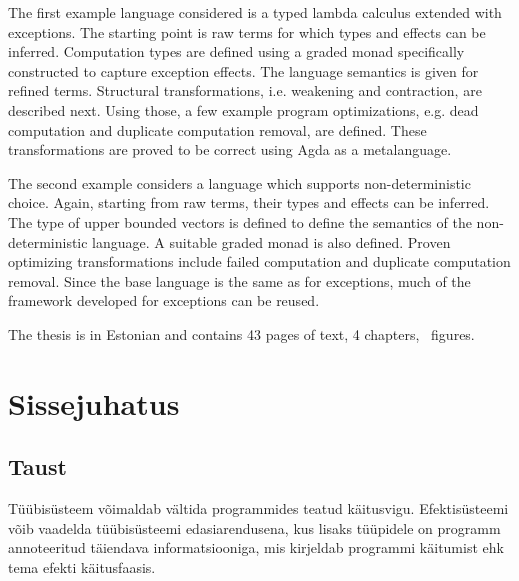 \documentclass[a4paper,12pt]{article}
\begin{document}
The first example language considered is a typed lambda calculus extended with exceptions.
The starting point is raw terms for which types and effects can be inferred.
Computation types are defined using a graded monad specifically constructed to capture exception effects.
The language semantics is given for refined terms.
Structural transformations, i.e. weakening and contraction, are described next.
Using those, a few example program optimizations, e.g. dead computation and duplicate computation removal, are defined.
These transformations are proved to be correct using Agda as a metalanguage.

The second example considers a language which supports non-deterministic choice.
Again, starting from raw terms, their types and effects can be inferred.
The type of upper bounded vectors is defined to define the semantics of the non-deterministic language.
A suitable graded monad is also defined.
Proven optimizing transformations include failed computation and duplicate computation removal.
Since the base language is the same as for exceptions, much of the framework developed for exceptions can be reused.

The thesis is in Estonian and contains 43 pages of text, 4 chapters, \totalfigures~figures.
\clearpage\vspace*{0pt}

\vspace*{60pt}
\begingroup
{}
\def\addvspace#1{}
\tableofcontents
\endgroup

\clearpage\vspace*{0pt}

\listoffigures

\clearpage\vspace*{0pt}

\section{Sissejuhatus}

\subsection{Taust}
Tüübisüsteem võimaldab vältida programmides teatud käitusvigu.
Efektisüsteemi võib vaadelda tüübisüsteemi edasiarendusena, kus lisaks tüüpidele on programm annoteeritud täiendava informatsiooniga, mis kirjeldab programmi käitumist ehk tema efekti käitusfaasis.
\end{document}
